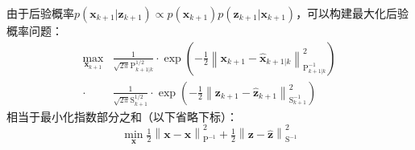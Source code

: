 由于后验概率$p(\bm{x}_{k+1}|\bm{z}_{k+1}) \propto p(\bm{x}_{k+1})p(\bm{z}_{k+1}|\bm{x}_{k+1})$，可以构建最大化后验概率问题：
\begin{equation}
\begin{aligned}
    \max_{\bm{x}_{k+1}}
        &\frac{1}{\sqrt{2\pi}\mathrm{P}_{k+1|k}^{1/2}}
        \cdot \exp \left( -\tfrac{1}{2}
            \left\| \bm{x}_{k+1}-\hat{\bm{x}}_{k+1|k} \right\|
            _{\mathrm{P}_{k+1|k}^{-1}}^2
        \right) \\
    \cdot
        &\frac{1}{\sqrt{2\pi}\mathrm{S}_{k+1}^{1/2}}
        \cdot \exp \left( -\tfrac{1}{2}
            \left\| \bm{z}_{k+1}-\hat{\bm{z}}_{k+1} \right\|
            _{\mathrm{S}_{k+1}^{-1}}^2
        \right)
\end{aligned}
\end{equation}
相当于最小化指数部分之和（以下省略下标）：
\begin{equation}
    \min_{\bm{x}} \tfrac{1}{2}
        \left\| \bm{x}-\hat{\bm{x}} \right\|
        _{{\mathrm{P}}^{-1}}^2 +
    \tfrac{1}{2}
        \left\| \bm{z}-\hat{\bm{z}} \right\|
        _{\mathrm{S}^{-1}}^2
\end{equation}
